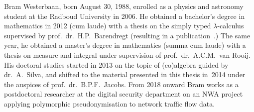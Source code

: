 \documentclass[b5paper]{book}
\begin{document}
Bram Westerbaan, born August 30, 1988,
enrolled as a physics and astronomy student at 
the Radboud University in 2006.
He obtained a bachelor's degree in mathematics in 2012 (cum laude)
with a thesis
on the simply typed $\lambda$-calculus
supervised by prof.~dr.~H.P.~Barendregt
(resulting in a publication~\cite{brambachelor}.)
The same year,
he obtained a master's degree in mathematics (summa cum laude)
with a thesis\cite{brammaster} on measure and integral
under supervision of prof.~dr.~A.C.M.~van Rooij.
His doctoral studies started in 2013
on the topic of (co)algebra guided by dr.~A.~Silva,
and shifted 
to the material presented in this thesis
in~2014
under the auspices of prof.~dr.~B.P.F.~Jacobs.
From 2018 onward Bram works as a postdoctoral researcher
at the digital security department on
an NWA project applying polymorphic pseudonymisation
to network traffic flow data.
\end{document}
